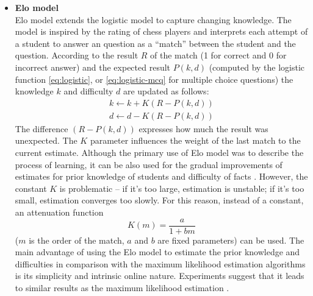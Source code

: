 \documentclass[12pt, twoside]{fithesis2}
\renewcommand{\_}{\leavevmode \kern0.07em\vbox{\hrule width0.4em}}
\newcommand{\squarebullet}{\textcolor{black}{\raisebox{0.15em}{\rule{4pt}{4pt}}}}
\newcommand{\emptysquarebullet}{\textcolor{black}{\raisebox{0.10em}{\tiny$\square$}}}
\newenvironment{myItemize}{
  \begin{itemize}[leftmargin=2em,rightmargin=1em,itemsep=\parskip ,parsep=0em,topsep=0em,partopsep=0em]
  \renewcommand{\labelitemi}{\squarebullet}
  \renewcommand{\labelitemii}{\textbullet}
}{
  \end{itemize}
}
\newcounter{choice}
\begin{document}
\begin{myItemize}
\item \textbf{Elo model}\\
  Elo model extends the logistic model to capture changing knowledge.
  The model is inspired by the rating of chess players \cite{elo-rating} and interprets each attempt of a student to answer an question as a ``match'' between the student and the question.
  According to the result $R$ of the match (1 for correct and 0 for incorrect answer)
  and the expected result $P(k, d)$
  (computed by the logistic function \ref{eq:logistic}, or \ref{eq:logistic-mcq} for multiple choice questions)
  the knowledge $k$ and difficulty $d$ are updated as follows:
  \begin{equation}\label{eq:elo}
  \begin{array}{l}
      k \gets k + K (R - P(k, d))\\
      d \gets d - K (R - P(k, d))
  \end{array}
  \end{equation}
The difference $(R - P(k, d))$ expresses how much the result was unexpected.
The $K$ parameter influences the weight of the last match to the current estimate.
Although the primary use of Elo model was to describe the process of learning,
it can be also used for the gradual improvements of estimates for prior knowledge of students and difficulty of facts \cite{slepe-mapy}.
However, the constant $K$ is problematic -- if it's too large, estimation is unstable; if it's too small, estimation converges too slowly.
For this reason, instead of a constant, an attenuation function
\begin{equation}\label{eq:attenuation}
  K(m) = \frac{a}{1 + bm}
\end{equation}
($m$ is the order of the match, $a$ and $b$ are fixed parameters) can be used.
The main advantage of using the Elo model to estimate the prior knowledge and difficulties in comparison with the maximum likelihood estimation algorithms is its simplicity and intrinsic online nature.
Experiments suggest that it leads to similar results as the maximum likelihood estimation \cite{slepe-mapy-time-elo}.


\end{myItemize}
\end{document}
